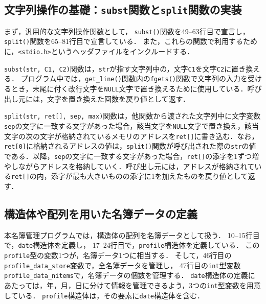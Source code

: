 \subsection{文字列操作の基礎：\texttt{subst}関数と\texttt{split}関数の実装}

まず，汎用的な文字列操作関数として，
\verb|subst()|関数を49--63行目で宣言し，
\verb|split()|関数を65--81行目で宣言している．
また，これらの関数で利用するために，\verb|<stdio.h>|というヘッダファイルをインクルードする．

\verb|subst(str, C1, C2)|関数は，\verb|str|が指す文字列中の，文字\verb|C1|を文字\verb|C2|に置き換える．
プログラム中では，\verb|get_line()|関数内の\verb|fgets()|関数で文字列の入力を受けるとき，末尾に付く改行文字を\verb|NULL|文字で置き換えるために使用している．呼び出し元には，文字を置き換えた回数を戻り値として返す．

\verb|split(str, ret[], sep, max)|関数は，他関数から渡された文字列中に文字変数\verb|sep|の文字に一致する文字があった場合，該当文字を\verb|NULL|文字で置き換え，該当文字の次の文字が格納されているメモリのアドレスを\verb|ret[]|に書き込む．なお，\verb|ret[0]|に格納されるアドレスの値は，\verb|split()|関数が呼び出された際の\verb|str|の値である．以降，\verb|sep|の文字に一致する文字があった場合，\verb|ret[]|の添字を1ずつ増やしながらアドレスを格納していく．呼び出し元には，アドレスが格納されている\verb|ret[]|の内，添字が最も大きいものの添字に1を加えたものを戻り値として返す．

\subsection{構造体や配列を用いた名簿データの定義}

本名簿管理プログラムでは，構造体の配列を名簿データとして扱う．
10--15行目で，\verb|date|構造体を定義し，
17--24行目で，\verb|profile|構造体を定義している．
この\verb|profile|型の変数1つが，名簿データ1つに相当する．
そして，46行目の\verb|profile_data_store|変数で，全名簿データを管理し，
47行目の\verb|int|型変数\verb|profile_data_nitems|で，名簿データの個数を管理する．
\verb|date|構造体の定義にあたっては，年，月，日に分けて情報を管理できるよう，3つの\verb|int|型変数を用意している．
\verb|profile|構造体は，その要素に\verb|date|構造体を含む．

